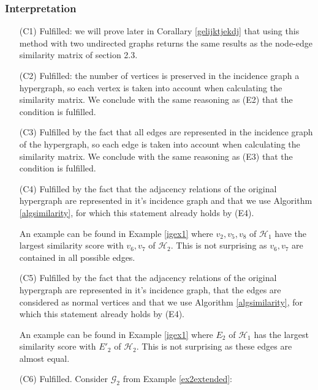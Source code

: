 \documentclass[a4paper,11pt]{report}
\newcommand{\hgraf}{\mathcal{G}}
\newcommand{\hgrafeen}{\mathcal{H}}
\begin{document}
\subsubsection{Interpretation}

\begin{itemize}
  \item[(C1)] Fulfilled: we will prove later in Corallary \ref{gelijktjekdj} 
  that using this method with two undirected graphs returns the same results as 
  the node-edge similarity matrix of section 2.3.
      \item[(C2)] Fulfilled: the number of vertices is preserved in the incidence graph a hypergraph, so each vertex is taken into account when calculating the similarity matrix. We conclude with the same reasoning as (E2) that the condition is fulfilled.
    \item[(C3)] Fulfilled by the fact that all edges are 
    represented in the incidence graph of the hypergraph, so each edge is taken into account when calculating the similarity matrix. We conclude with the same reasoning as (E3) that the condition is fulfilled.

  \item[(C4)] Fulfilled by the fact that the adjacency relations of the original hypergraph are represented in it's 
  incidence graph and that we use Algorithm \ref{algsimilarity}, for which this 
  statement already holds by (E4).
  
  An example can be found in Example \ref{igex1} where $v_2, v_5, v_8$ of $\hgrafeen_1$ 
  have the largest similarity score with $v_6, v_7$ of $\hgrafeen_2$. This is 
  not surprising as $v_6, v_7$ are contained in all possible edges.
  \item[(C5)] Fulfilled by the fact that the adjacency relations of the original hypergraph are represented in it's 
  incidence graph, that the edges are considered as normal vertices and that we use Algorithm \ref{algsimilarity}, for which this 
  statement already holds by (E4).
  
  
  An example can be found in Example \ref{igex1} where $E_2$ of $\hgrafeen_1$ 
  has the largest similarity score with $E'_2$ of $\hgrafeen_2$. This is 
  not surprising as these edges are almost equal.


  \item[(C6)] Fulfilled. Consider $\hgraf_2$ from Example \ref{ex2extended}:

       \begin{center}
\end{center}
\end{itemize}
\end{document}
